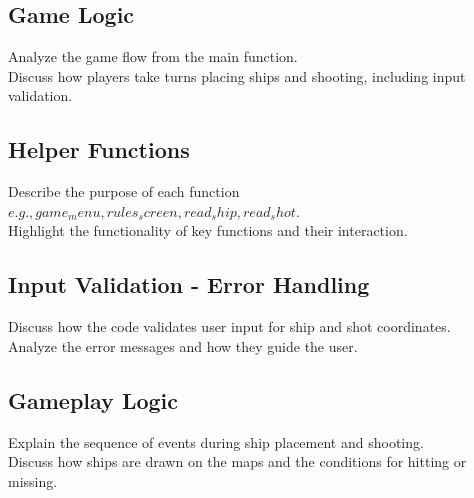 \subsection{Game Logic}
Analyze the game flow from the main function.\\

Discuss how players take turns placing ships and shooting, including input validation.

\subsection{Helper Functions}
Describe the purpose of each function \(e.g., game_menu, rules_screen, read_ship, read_shot\).\\

Highlight the functionality of key functions and their interaction.

\subsection{Input Validation - Error Handling}
Discuss how the code validates user input for ship and shot coordinates. \\

Analyze the error messages and how they guide the user.

\subsection{Gameplay Logic}
Explain the sequence of events during ship placement and shooting.\\

Discuss how ships are drawn on the maps and the conditions for hitting or missing.